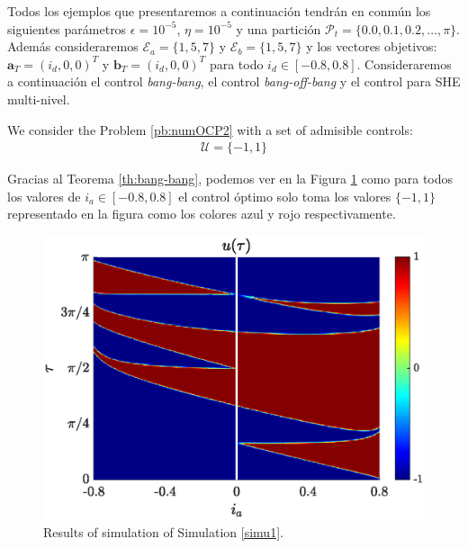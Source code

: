 Todos los ejemplos que presentaremos a continuación tendrán en conmún los siguientes parámetros $\epsilon = 10^{-5}$, $\eta = 10^{-5}$ y una partición $\mathcal{P}_t = \{0.0 , 0.1, 0.2 ,\dots,\pi\}$. Además consideraremos $\mathcal{E}_a = \{1,5,7\}$ y  $\mathcal{E}_b = \{1,5,7\}$ y los vectores objetivos: $\bm{a}_T = (i_d,0,0)^T$ y $\bm{b}_T = (i_d,0,0)^T$ para todo $i_d \in [-0.8,0.8]$.  Consideraremos a continuación el control \emph{bang-bang}, el control \emph{bang-off-bang} y el control para SHE multi-nivel. 

\vspace{1em}
\begin{simulation}\label{simu1}
We consider the Problem \ref{pb:numOCP2} with a set of admisible controls:
    \begin{gather}
    \mathcal{U} = \{-1,1\}
\end{gather}
\end{simulation}
Gracias al Teorema \ref{th:bang-bang}, podemos ver en la Figura \ref{fig:sim-bang-bang}  como para todos los valores de $i_a \in [-0.8,0.8]$ el control óptimo solo toma los valores $\{-1,1\}$ representado en la figura como los colores azul y rojo respectivamente.

\begin{figure}[ht!]
    \hspace{0.05em}
    \includegraphics[scale=0.525]{img/fig05.eps}
    \caption{Results of simulation of Simulation \ref{simu1}.}
    \label{fig:sim-bang-bang}
\end{figure} 

